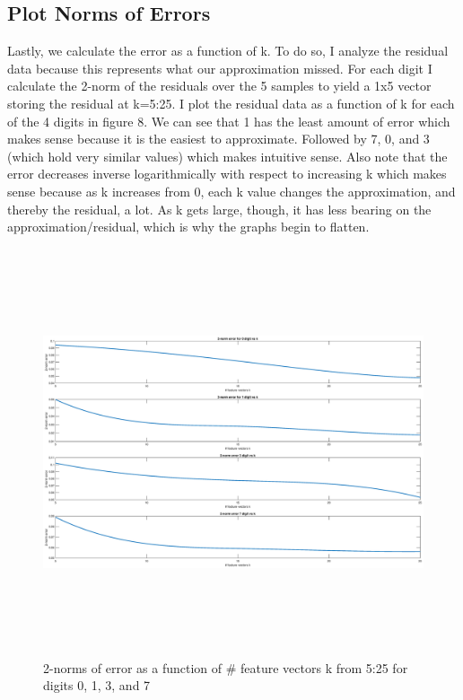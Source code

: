 \documentclass{article}
\begin{document}
\subsection*{Plot Norms of Errors}
Lastly, we calculate the error as a function of k.  To do so, I analyze the residual data because this represents what our approximation missed.  For each digit I calculate the 2-norm of the residuals over the 5 samples to yield a 1x5 vector storing the residual at k=5:25.  I plot the residual data as a function of k for each of the 4 digits in figure 8.  We can see that 1 has the least amount of error which makes sense because it is the easiest to approximate.  Followed by 7, 0, and 3 (which hold very similar values) which makes intuitive sense.  Also note that the error decreases inverse logarithmically with respect to increasing k which makes sense because as k increases from 0, each k value changes the approximation, and thereby the residual, a lot.  As k gets large, though, it has less bearing on the approximation/residual, which is why the graphs begin to flatten.  

    \begin{figure}[!h]
        \centerline
        {
        \includegraphics[width=15cm, height=12cm] {Q_2_error}
        }
        \caption{\label{fig:my figure}  2-norms of error as a function of # feature vectors k from 5:25 for digits 0, 1, 3, and 7}
    \end{figure}
    
\end{document}
